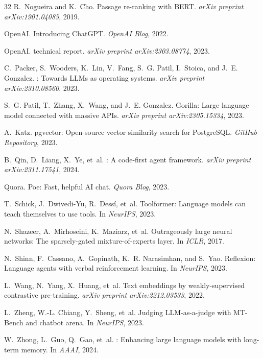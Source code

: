 \documentclass[11pt,twocolumn]{article}
\begin{document}
\begin{thebibliography}{32}
R.~Nogueira and K.~Cho.
\newblock Passage re-ranking with {BERT}.
\newblock \emph{arXiv preprint arXiv:1901.04085}, 2019.

OpenAI.
\newblock Introducing {ChatGPT}.
\newblock \emph{OpenAI Blog}, 2022.

OpenAI.
 technical report.
\newblock \emph{arXiv preprint arXiv:2303.08774}, 2023.

C.~Packer, S.~Wooders, K.~Lin, V.~Fang, S.~G. Patil, I.~Stoica, and J.~E. Gonzalez.
: Towards {LLM}s as operating systems.
\newblock \emph{arXiv preprint arXiv:2310.08560}, 2023.

S.~G. Patil, T.~Zhang, X.~Wang, and J.~E. Gonzalez.
\newblock Gorilla: Large language model connected with massive {API}s.
\newblock \emph{arXiv preprint arXiv:2305.15334}, 2023.

A.~Katz.
\newblock pgvector: Open-source vector similarity search for {PostgreSQL}.
\newblock \emph{GitHub Repository}, 2023.

B.~Qin, D.~Liang, X.~Ye, et~al.
: A code-first agent framework.
\newblock \emph{arXiv preprint arXiv:2311.17541}, 2024.

Quora.
\newblock Poe: Fast, helpful {AI} chat.
\newblock \emph{Quora Blog}, 2023.

T.~Schick, J.~Dwivedi-Yu, R.~Dess\'i, et~al.
\newblock Toolformer: Language models can teach themselves to use tools.
\newblock In \emph{NeurIPS}, 2023.

N.~Shazeer, A.~Mirhoseini, K.~Maziarz, et~al.
\newblock Outrageously large neural networks: The sparsely-gated mixture-of-experts layer.
\newblock In \emph{ICLR}, 2017.

N.~Shinn, F.~Cassano, A.~Gopinath, K.~R. Narasimhan, and S.~Yao.
\newblock Reflexion: Language agents with verbal reinforcement learning.
\newblock In \emph{NeurIPS}, 2023.

L.~Wang, N.~Yang, X.~Huang, et~al.
\newblock Text embeddings by weakly-supervised contrastive pre-training.
\newblock \emph{arXiv preprint arXiv:2212.03533}, 2022.

L.~Zheng, W.-L. Chiang, Y.~Sheng, et~al.
\newblock Judging {LLM}-as-a-judge with {MT-Bench} and chatbot arena.
\newblock In \emph{NeurIPS}, 2023.

W.~Zhong, L.~Guo, Q.~Gao, et~al.
: Enhancing large language models with long-term memory.
\newblock In \emph{AAAI}, 2024.

\end{thebibliography}
\end{document}
